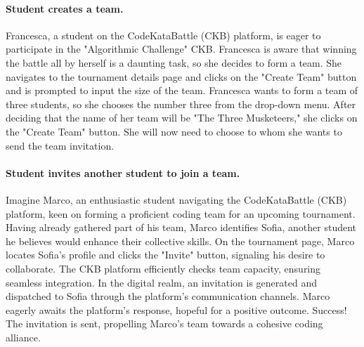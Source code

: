\paragraph*{Student creates a team.}
Francesca, a student on the CodeKataBattle (CKB) platform, is eager to participate in the "Algorithmic Challenge" CKB.
Francesca is aware that winning the battle all by herself is a daunting task, so she decides to form a team.
She navigates to the tournament details page and clicks on the "Create Team" button and is prompted to input the size of the team.
Francesca wants to form a team of three students, so she chooses the number three from the drop-down menu.
After deciding that the name of her team will be "The Three Musketeers," she clicks on the "Create Team" button.
She will now need to choose to whom she wants to send the team invitation.


\paragraph*{Student invites another student to join a team.}
Imagine Marco, an enthusiastic student navigating the CodeKataBattle (CKB) platform, keen on forming a proficient coding team for an upcoming tournament. 
Having already gathered part of his team, Marco identifies Sofia, another student he believes would enhance their collective skills.
On the tournament page, Marco locates Sofia's profile and clicks the "Invite" button, signaling his desire to collaborate. 
The CKB platform efficiently checks team capacity, ensuring seamless integration.
In the digital realm, an invitation is generated and dispatched to Sofia through the platform's communication channels. 
Marco eagerly awaits the platform's response, hopeful for a positive outcome.
Success! The invitation is sent, propelling Marco's team towards a cohesive coding alliance.



